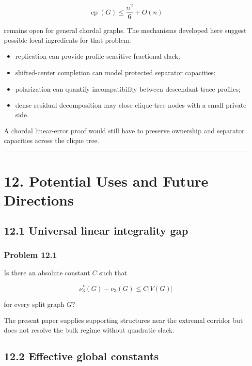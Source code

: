 \documentclass[11pt,a4paper]{article}
\providecommand{\tightlist}{\setlength{\itemsep}{0pt}\setlength{\parskip}{0pt}}
\begin{document}
\[
\operatorname{cp}(G)
\le
\frac{n^2}{6}+O(n)
\]

remains open for general chordal graphs. The mechanisms developed here suggest possible local ingredients for that problem:

\begin{itemize}
\tightlist
\item
  replication can provide profile-sensitive fractional slack;
\item
  shifted-center completion can model protected separator capacities;
\item
  polarization can quantify incompatibility between descendant trace profiles;
\item
  dense residual decomposition may close clique-tree nodes with a small private side.
\end{itemize}

A chordal linear-error proof would still have to preserve ownership and separator capacities across the clique tree.

\begin{center}\rule{0.5\linewidth}{0.5pt}\end{center}

\section{12. Potential Uses and Future Directions}\label{potential-uses-and-future-directions}

\subsection{12.1 Universal linear integrality gap}\label{universal-linear-integrality-gap}

\subsubsection{Problem 12.1}\label{problem-12.1}

Is there an absolute constant \(C\) such that

\[
\nu_3^*(G)-\nu_3(G)
\le C|V(G)|
\]

for every split graph \(G\)?

The present paper supplies supporting structures near the extremal corridor but does not resolve the bulk regime without quadratic slack.

\subsection{12.2 Effective global constants}\label{effective-global-constants}
\end{document}
